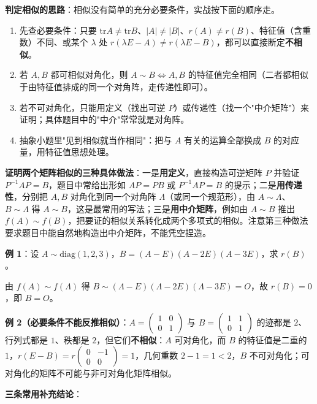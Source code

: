 \documentclass[11pt,openany,UTF8]{ctexbook}
\begin{document}
\textbf{判定相似的思路}：相似没有简单的充分必要条件，实战按下面的顺序走。

\begin{enumerate}
\item 先查必要条件：只要 $\mathrm{tr}A\neq\mathrm{tr}B$、$\vert A\vert\neq\vert B\vert$、$r(A)\neq r(B)$、特征值（含重数）不同、或某个 $\lambda$ 处 $r(\lambda E-A)\neq r(\lambda E-B)$，都可以直接断定\textbf{不相似}。
\item 若 $A,B$ 都可相似对角化，则 $A\sim B\iff A,B$ 的特征值完全相同（二者都相似于由特征值排成的同一个对角阵，走传递性即可）。
\item 若不可对角化，只能用定义（找出可逆 $P$）或传递性（找一个"中介矩阵"）来证明；具体题目中的"中介"常常就是对角阵。
\item 抽象小题里"见到相似就当作相同"：把与 $A$ 有关的运算全部换成 $B$ 的对应量，用特征值思想处理。
\end{enumerate}
\textbf{证明两个矩阵相似的三种具体做法}：一是\textbf{用定义}，直接构造可逆矩阵 $P$ 并验证 $P^{-1}AP=B$，题目中常给出形如 $AP=PB$ 或 $P^{-1}AP=B$ 的提示；二是\textbf{用传递性}，分别把 $A,B$ 对角化到同一个对角阵 $\Lambda$（或同一个规范形），由 $A\sim\Lambda$、$B\sim\Lambda$ 得 $A\sim B$，这是最常用的写法；三是\textbf{用中介矩阵}，例如由 $A\sim B$ 推出 $f(A)\sim f(B)$，把要证的相似关系转化成两个多项式的相似。注意第三种做法要求题目中能自然地构造出中介矩阵，不能凭空捏造。

\textbf{例 1}：设 $A\sim\mathrm{diag}(1,2,3)$，$B=(A-E)(A-2E)(A-3E)$，求 $r(B)$。

由 $f(A)\sim f(\Lambda)$ 得 $B\sim(\Lambda-E)(\Lambda-2E)(\Lambda-3E)=O$，故 $r(B)=0$，即 $B=O$。

\textbf{例 2（必要条件不能反推相似）}：$A=\begin{pmatrix}1&0\\0&1\end{pmatrix}$ 与 $B=\begin{pmatrix}1&1\\0&1\end{pmatrix}$ 的迹都是 $2$、行列式都是 $1$、秩都是 $2$，但它们\textbf{不相似}：$A$ 可对角化，而 $B$ 的特征值是二重的 $1$，$r(E-B)=r\begin{pmatrix}0&-1\\0&0\end{pmatrix}=1$，几何重数 $2-1=1<2$，$B$ 不可对角化；可对角化的矩阵不可能与非可对角化矩阵相似。

\textbf{三条常用补充结论}：
\end{document}
